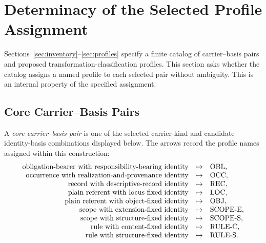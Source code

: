 
\section{Determinacy of the Selected Profile Assignment}
\label{sec:determinacy}

Sections~\ref{sec:inventory}--\ref{sec:profiles} specify a finite catalog of
carrier--basis pairs and proposed transformation-classification profiles.
This section asks whether the catalog assigns a named profile to each
selected pair without ambiguity.
This is an internal property of the specified assignment.

\subsection{Core Carrier--Basis Pairs}
\label{subsec:core_carrier_basis_pairs}

\begin{definition}
\label{se200.def.CoreCarrierBasisPair}
A \emph{core carrier--basis pair} is one of the selected carrier-kind
and candidate identity-basis combinations displayed below.
The arrows
record the profile names assigned within this construction:
\[
\begin{array}{rcl}
\text{obligation-bearer with responsibility-bearing identity} &\mapsto& \mathrm{OBL},\\
\text{occurrence with realization-and-provenance identity} &\mapsto& \mathrm{OCC},\\
\text{record with descriptive-record identity} &\mapsto& \mathrm{REC},\\
\text{plain referent with locus-fixed identity} &\mapsto& \mathrm{LOC},\\
\text{plain referent with object-fixed identity} &\mapsto& \mathrm{OBJ},\\
\text{scope with extension-fixed identity} &\mapsto& \mathrm{SCOPE\text{-}E},\\
\text{scope with structure-fixed identity} &\mapsto& \mathrm{SCOPE\text{-}S},\\
\text{rule with content-fixed identity} &\mapsto& \mathrm{RULE\text{-}C},\\
\text{rule with structure-fixed identity} &\mapsto& \mathrm{RULE\text{-}S}.
\end{array}
\]
\end{definition}

